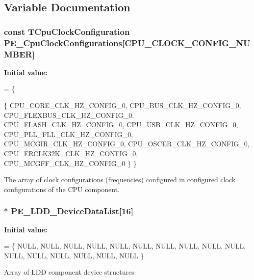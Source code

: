 \subsection{Variable Documentation}
\hypertarget{group___p_e___l_d_d__module_gab69281f0e90d16198a5595ed7f471441}{
\subsubsection[{P\-E\-\_\-\-Cpu\-Clock\-Configurations}]{\setlength{\rightskip}{0pt plus 5cm}const {\bf T\-Cpu\-Clock\-Configuration} P\-E\-\_\-\-Cpu\-Clock\-Configurations\mbox{[}C\-P\-U\-\_\-\-C\-L\-O\-C\-K\-\_\-\-C\-O\-N\-F\-I\-G\-\_\-\-N\-U\-M\-B\-E\-R\mbox{]}}}\label{group___p_e___l_d_d__module_gab69281f0e90d16198a5595ed7f471441}
{\bfseries Initial value\-:}
\begin{DoxyCode}
= \{
  
  \{
    CPU\_CORE\_CLK\_HZ\_CONFIG\_0,          
    CPU\_BUS\_CLK\_HZ\_CONFIG\_0,           
    CPU\_FLEXBUS\_CLK\_HZ\_CONFIG\_0,       
    CPU\_FLASH\_CLK\_HZ\_CONFIG\_0,         
    CPU\_USB\_CLK\_HZ\_CONFIG\_0,           
    CPU\_PLL\_FLL\_CLK\_HZ\_CONFIG\_0,       
    CPU\_MCGIR\_CLK\_HZ\_CONFIG\_0,         
    CPU\_OSCER\_CLK\_HZ\_CONFIG\_0,         
    CPU\_ERCLK32K\_CLK\_HZ\_CONFIG\_0,      
    CPU\_MCGFF\_CLK\_HZ\_CONFIG\_0          
  \}
\}
\end{DoxyCode}
The array of clock configurations (frequencies) configured in configured clock configurations of the C\-P\-U component. \hypertarget{group___p_e___l_d_d__module_ga0e190ffd5b611678884f6e3d99a9d0ac}{
\subsubsection[{P\-E\-\_\-\-L\-D\-D\-\_\-\-Device\-Data\-List}]{$\ast$ P\-E\-\_\-\-L\-D\-D\-\_\-\-Device\-Data\-List\mbox{[}16\mbox{]}}}\label{group___p_e___l_d_d__module_ga0e190ffd5b611678884f6e3d99a9d0ac}
{\bfseries Initial value\-:}
\begin{DoxyCode}
= \{
    NULL,
    NULL,
    NULL,
    NULL,
    NULL,
    NULL,
    NULL,
    NULL,
    NULL,
    NULL,
    NULL,
    NULL,
    NULL,
    NULL,
    NULL,
    NULL
  \}
\end{DoxyCode}
Array of L\-D\-D component device structures 